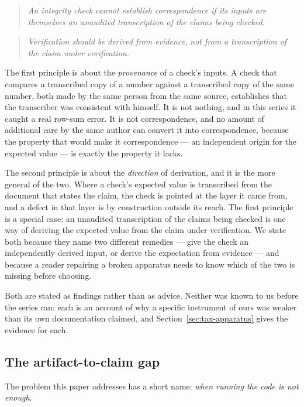 \documentclass[sigconf,review]{acmart}
\begin{document}
\begin{quote}
\emph{An integrity check cannot establish correspondence if its inputs are
themselves an unaudited transcription of the claims being checked.}
\end{quote}

\begin{quote}
\emph{Verification should be derived from evidence, not from a transcription of
the claim under verification.}
\end{quote}

The first principle is about the \emph{provenance} of a check's inputs. A check
that compares a transcribed copy of a number against a transcribed copy of the
same number, both made by the same person from the same source, establishes
that the transcriber was consistent with himself. It is not nothing, and in
this series it caught a real row-sum error. It is not correspondence, and no
amount of additional care by the same author can convert it into correspondence,
because the property that would make it correspondence --- an independent origin
for the expected value --- is exactly the property it lacks.

The second principle is about the \emph{direction} of derivation, and it is the
more general of the two. Where a check's expected value is transcribed from the
document that states the claim, the check is pointed at the layer it came from,
and a defect in that layer is by construction outside its reach. The first
principle is a special case: an unaudited transcription of the claims being
checked is one way of deriving the expected value from the claim under
verification. We state both because they name two different remedies --- give
the check an independently derived input, or derive the expectation from
evidence --- and because a reader repairing a broken apparatus needs to know
which of the two is missing before choosing.

Both are stated as findings rather than as advice. Neither was known to us
before the series ran: each is an account of why a specific instrument of ours
was weaker than its own documentation claimed, and
Section~\ref{sec:tax-apparatus} gives the evidence for each.

\subsection{The artifact-to-claim gap}
\label{sec:intro-gap}

The problem this paper addresses has a short name: \emph{when running the
code is not enough}.
\end{document}
